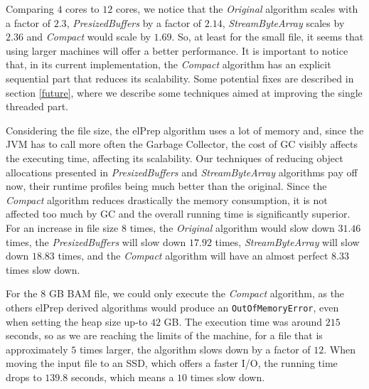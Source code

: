 \documentclass[a4paper,twoside]{article}
\begin{document}
Comparing $4$ cores to $12$ cores, we notice that the {\it Original} algorithm scales with a factor of $2.3$, {\it PresizedBuffers} by a factor of $2.14$, {\it StreamByteArray} scales by $2.36$ and {\it Compact} would scale by $1.69$. So, at least for the small file, it seems that using larger machines will offer a better performance. It is important to notice that, in its current implementation, the {\it Compact} algorithm has an explicit sequential part that reduces its scalability. 
Some potential fixes are described in section \ref{future}, where we describe some techniques aimed at improving the single threaded part.

Considering the file size, the elPrep algorithm uses a lot of memory and, since the JVM has to call more often the Garbage Collector, the cost of GC visibly affects the executing time, affecting its scalability. Our techniques of reducing object allocations presented in {\it PresizedBuffers} and {\it StreamByteArray} algorithms pay off now, their runtime profiles being much better than the original. Since the {\it Compact} algorithm reduces drastically the memory consumption, it is not affected too much by GC and the overall running time is significantly superior. 
For an increase in file size $8$ times, the {\it Original} algorithm would slow down $31.46$ times, the {\it PresizedBuffers} will slow down $17.92$ times, {\it StreamByteArray} will slow down $18.83$ times,
and the {\it Compact} algorithm will have an almost perfect $8.33$ times slow down.

For the $8$ GB BAM file, we could only execute the {\it Compact} algorithm, as the others elPrep derived algorithms would produce an \texttt{OutOfMemoryError}, even when setting the heap size up-to $42$ GB.
The execution time was around $215$ seconds, so as we are reaching the limits of the machine, for a file that is approximately $5$ times larger, the algorithm slows down by a factor of $12$. When moving the input file to an SSD, which offers a faster I/O, the running time drops to $139.8$ seconds, which means a $10$ times slow down.
\end{document}
